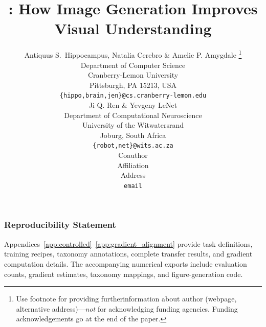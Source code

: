 \documentclass{article} %
\title{\methodname: How Image Generation Improves Visual Understanding}
\author{Antiquus S.~Hippocampus, Natalia Cerebro \& Amelie P. Amygdale \thanks{ Use footnote for providing furtherinformation
about author (webpage, alternative address)---\emph{not} for acknowledging
funding agencies.  Funding acknowledgements go at the end of the paper.} \\
Department of Computer Science\\
Cranberry-Lemon University\\
Pittsburgh, PA 15213, USA \\
\texttt{\{hippo,brain,jen\}@cs.cranberry-lemon.edu} \\
\And
Ji Q. Ren \& Yevgeny LeNet \\
Department of Computational Neuroscience \\
University of the Witwatersrand \\
Joburg, South Africa \\
\texttt{\{robot,net\}@wits.ac.za} \\
\AND
Coauthor \\
Affiliation \\
Address \\
\texttt{email}
}
\begin{document}
\maketitle
{} %











\subsubsection*{Reproducibility Statement}
Appendices~\ref{app:controlled}--\ref{app:gradient_alignment} provide task definitions, training recipes, taxonomy annotations, complete transfer results, and gradient computation details. The accompanying numerical exports include evaluation counts, gradient estimates, taxonomy mappings, and figure-generation code.




\appendix
{}  %
\end{document}
